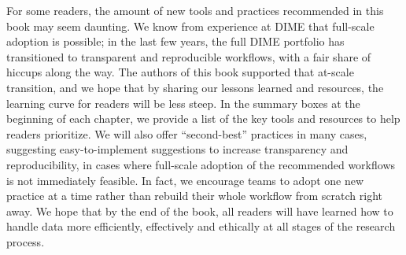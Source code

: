 For some readers, the amount of new tools and practices recommended in this book may seem daunting.
We know from experience at DIME that full-scale adoption is possible;
in the last few years, the full DIME portfolio has transitioned to 
transparent and reproducible workflows, with a fair share of hiccups along the way.
The authors of this book supported that at-scale transition,
and we hope that by sharing our lessons learned and resources, 
the learning curve for readers will be less steep. 
In the summary boxes at the beginning of each chapter, 
we provide a list of the key tools and resources to help readers prioritize.
We will also offer ``second-best'' practices in many cases, 
suggesting easy-to-implement suggestions to increase transparency and reproducibility,
in cases where full-scale adoption of the recommended workflows is not immediately feasible.
In fact, we encourage teams to adopt one new practice at a time 
rather than rebuild their whole workflow from scratch right away.
We hope that by the end of the book,
all readers will have learned how to handle data more efficiently, effectively and ethically
at all stages of the research process.

\mainmatter
